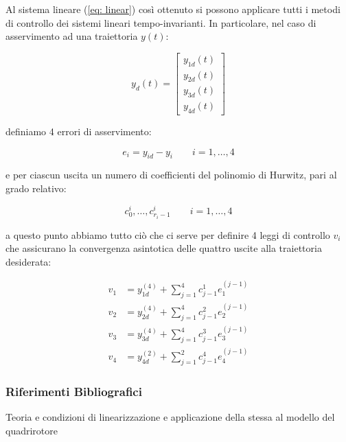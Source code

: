 \documentclass[a4paper,10pt]{article}
\begin{document}
Al sistema lineare (\ref{eq: linear}) così ottenuto si possono applicare tutti i metodi di controllo dei sistemi lineari tempo-invarianti. In particolare, nel caso di asservimento ad una traiettoria $y(t)$:

\begin{equation}
y_d(t) = \begin{bmatrix} y_{1d}(t)\\ y_{2d}(t)\\ y_{3d}(t)\\ y_{4d}(t) \end{bmatrix}
\end{equation}

\noindent definiamo 4 errori di asservimento:

\begin{equation}
e_i = y_{id} - y_i \qquad i = 1,\ldots, 4
\end{equation}

\noindent e per ciascun uscita un numero di coefficienti del polinomio di Hurwitz, pari al grado relativo:

\begin{equation}
c_0^{i},\ldots ,c_{r_i - 1}^{i} \qquad i = 1,\ldots, 4
\end{equation}

\noindent a questo punto abbiamo tutto ciò che ci serve per definire 4 leggi di controllo $v_i$ che assicurano la convergenza asintotica delle quattro uscite alla traiettoria desiderata:

\begin{equation}\begin{split}\label{pddd}
v_1 &= y_{1d}^{(4)} + \sum_{j = 1}^{4} c_{j-1}^{1} e_1^{(j-1)}\\
v_2 &= y_{2d}^{(4)} + \sum_{j = 1}^{4} c_{j-1}^{2} e_2^{(j-1)}\\
v_3 &= y_{3d}^{(4)} + \sum_{j = 1}^{4} c_{j-1}^{3} e_3^{(j-1)}\\
v_4 &= y_{4d}^{(2)} + \sum_{j = 1}^{2} c_{j-1}^{4} e_4^{(j-1)}
\end{split}
\end{equation}

\subsubsection*{Riferimenti Bibliografici}

Teoria e condizioni di linearizzazione \cite{Isidori1986,NonLinearKhalil,NonLinearIsidoril} e applicazione della stessa al modello del quadrirotore \cite{Mistler2001,Al-Hiddabi2009}
\end{document}
